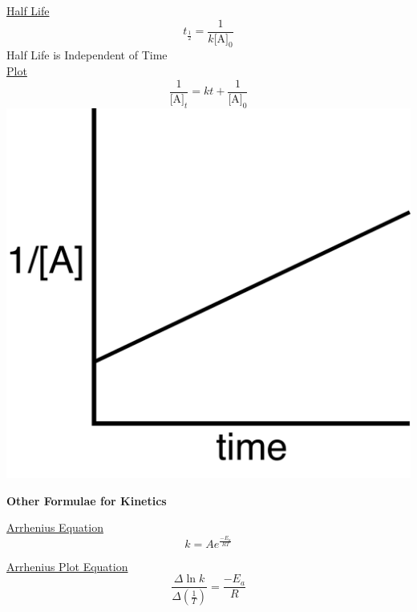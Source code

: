 \documentclass{article}
\begin{document}
\begin{center}
\begin{multicols}{3}
    \underline{Half Life}
    \[
        t_{\frac{1}{2}} = \frac{1}{k\textrm{[A]}_0}
    \]
    \footnotesize
    Half Life is Independent of Time
    \normalsize\\
    \medskip
    \underline{Plot}
    \[
        \frac{1}{\textrm{[A]}_t} = kt + \frac{1}{\textrm{[A]}_0}
    \]
    \includegraphics[scale =0.25]{firstorder.png}

\end{multicols}
\begin{large}
\textbf{Other Formulae for Kinetics}
\end{large}

\begin{multicols}{2}
    
    \underline{Arrhenius Equation}
    \[
        k = Ae^{\frac{-E_a}{RT}}
    \]
    
    \underline{Arrhenius Plot Equation}
    \[
        \frac{\Delta\ln{k}}{\Delta\left(\frac{1}{T}\right)} = \frac{-E_a}{R}
    \]
    
\end{multicols}

\end{center}
\end{document}
